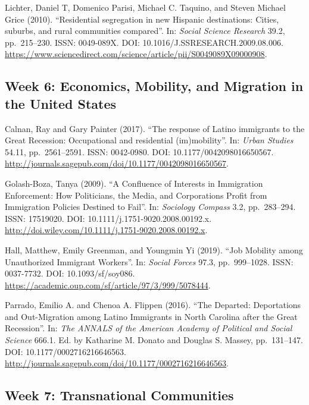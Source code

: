 \documentclass[11pt,]{article}
\begin{document}
Lichter, Daniel T, Domenico Parisi, Michael C. Taquino, and Steven
Michael Grice (2010). ``Residential segregation in new Hispanic
destinations: Cities, suburbs, and rural communities compared''. In:
\emph{Social Science Research} 39.2, pp.~215--230. ISSN: 0049-089X. DOI:
10.1016/J.SSRESEARCH.2009.08.006.
\url{https://www.sciencedirect.com/science/article/pii/S0049089X09000908}.

\hypertarget{week-6-economics-mobility-and-migration-in-the-united-states}{%
\subsection{Week 6: Economics, Mobility, and Migration in the United
States}\label{week-6-economics-mobility-and-migration-in-the-united-states}}

Calnan, Ray and Gary Painter (2017). ``The response of Latino immigrants
to the Great Recession: Occupational and residential (im)mobility''. In:
\emph{Urban Studies} 54.11, pp.~2561--2591. ISSN: 0042-0980. DOI:
10.1177/0042098016650567.
\url{http://journals.sagepub.com/doi/10.1177/0042098016650567}.

Golash-Boza, Tanya (2009). ``A Confluence of Interests in Immigration
Enforcement: How Politicians, the Media, and Corporations Profit from
Immigration Policies Destined to Fail''. In: \emph{Sociology Compass}
3.2, pp.~283--294. ISSN: 17519020. DOI:
10.1111/j.1751-9020.2008.00192.x.
\url{http://doi.wiley.com/10.1111/j.1751-9020.2008.00192.x}.

Hall, Matthew, Emily Greenman, and Youngmin Yi (2019). ``Job Mobility
among Unauthorized Immigrant Workers''. In: \emph{Social Forces} 97.3,
pp.~999--1028. ISSN: 0037-7732. DOI: 10.1093/sf/soy086.
\url{https://academic.oup.com/sf/article/97/3/999/5078444}.

Parrado, Emilio A. and Chenoa A. Flippen (2016). ``The Departed:
Deportations and Out-Migration among Latino Immigrants in North Carolina
after the Great Recession''. In:
\emph{The ANNALS of the American Academy of Political and Social Science}
666.1. Ed. by Katharine M. Donato and Douglas S. Massey, pp.~131--147.
DOI: 10.1177/0002716216646563.
\url{http://journals.sagepub.com/doi/10.1177/0002716216646563}.

\hypertarget{week-7-transnational-communities}{%
\subsection{Week 7: Transnational
Communities}\label{week-7-transnational-communities}}
\end{document}
